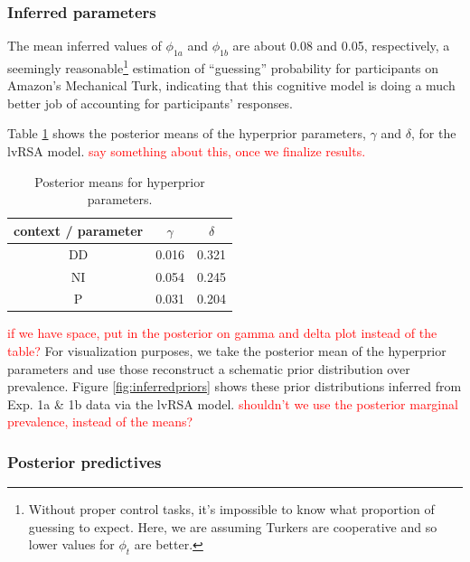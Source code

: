 \documentclass[10pt,letterpaper]{article}
\newcommand{\red}[1]{\textcolor{Red}{#1}}
\begin{document}
\subsubsection{Inferred parameters}
The mean inferred values of  $\phi_{1a}$ and $\phi_{1b}$ are about 0.08 and 0.05, respectively, a seemingly reasonable\footnote{Without proper control tasks, it's impossible to know what proportion of guessing to expect. Here, we are assuming Turkers are cooperative and so lower values for $\phi_{t}$ are better.} estimation of ``guessing'' probability for participants on Amazon's Mechanical Turk, indicating that this cognitive model is doing a much better job of accounting for participants' responses.

Table \ref{table:postmeans} shows the posterior means of the hyperprior parameters, $\gamma$ and $\delta$, for the lvRSA model. \red{say something about this, once we finalize results.}
\begin{table}[h]
\centering
\begin{tabular}{c | c | c}
context / parameter & $\gamma$ & $\delta$ \\
\hline
DD                  & 0.016  & 0.321  \\
NI                  & 0.054  & 0.245  \\
P                   & 0.031  & 0.204 
\end{tabular}
\caption{Posterior means for hyperprior parameters.}
\label{table:postmeans}
\end{table}
\red{if we have space, put in the posterior on gamma and delta plot instead of the table?}
For visualization purposes, we take the posterior mean of the hyperprior parameters and use those reconstruct a schematic prior distribution over prevalence. Figure \ref{fig:inferredpriors} shows these prior distributions inferred from Exp. 1a \& 1b data via the lvRSA model. \red{shouldn't we use the posterior marginal prevalence, instead of the means?}


\subsubsection{Posterior predictives}
\end{document}

